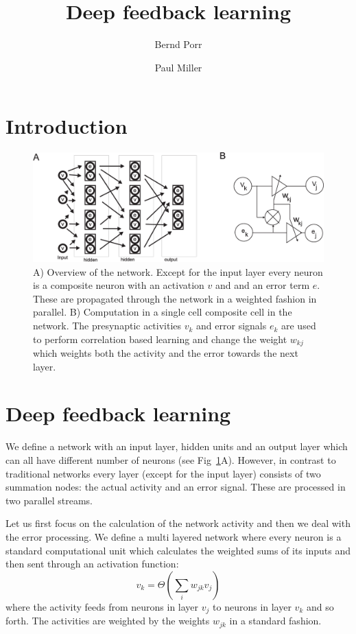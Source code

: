 \documentclass{llncs}
\title{Deep feedback learning}
\author{Bernd Porr \and Paul Miller}
\institute{Glasgow Neuro, bernd,paul@glasgowneuro.tech}
\begin{document}
\maketitle

\begin{abstract}
\end{abstract}

\section{Introduction}

\begin{figure}[h!]
  \centering
  \includegraphics[width=\columnwidth]{netw_together}
  \caption{A) Overview of the network. Except for the input layer
    every neuron is a composite neuron with an activation $v$ and
    and an error term $e$. These are propagated through the network
    in a weighted fashion in parallel.
B) Computation in a single cell composite cell in the network.
    The presynaptic activities $v_k$ and error signals $e_k$ are used
    to perform correlation based learning and change the weight $w_{kj}$
    which weights both the activity and the error towards the next
    layer.\label{netw_together}}
\end{figure}


\section{Deep feedback learning}
We define a network with an input layer, hidden units and an output
layer which can all have different number of neurons (see
Fig~\ref{netw_together}A). However, in contrast to traditional
networks every layer (except for the input layer) consists of two
summation nodes: the actual activity and an error signal. These
are processed in two parallel streams.

Let us first focus on the calculation of the network activity and then
we deal with the error processing. We define a multi layered network
where every neuron is a standard computational unit which calculates
the weighted sums of its inputs and then sent through an activation
function:
\begin{equation}
  v_k = \Theta\left( \sum_i w_{jk} v_{j} \right)
\end{equation}
where the activity feeds from neurons in layer $v_j$ to neurons in layer $v_k$
and so forth. The activities are weighted by the weights $w_{jk}$
in a standard fashion.
\end{document}
